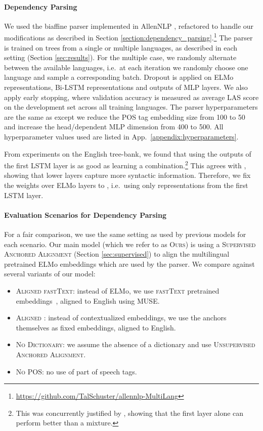 \documentclass[11pt,a4paper]{article}
\newcommand{\secref}[1]{Section \ref{#1}}
\newcommand{\appref}[1]{App.~\ref{#1}}
\begin{document}
\paragraph{Dependency Parsing}
We used the biaffine parser implemented in AllenNLP \cite{gardner_allennlp_2018}, refactored to handle our modifications as described in \secref{section:dependency_parsing}.\footnote{\url{https://github.com/TalSchuster/allennlp-MultiLang}} The parser is trained on trees from a single or multiple languages, as described in each setting (\secref{sec:results}). For the multiple case, we randomly alternate between the available languages, i.e.\ at each iteration we randomly choose one language and sample a corresponding batch.
Dropout \cite{srivastava_dropout:_2014} is applied on ELMo representations, Bi-LSTM representations and outputs of MLP layers. We also apply early stopping, where validation accuracy is measured as average LAS score on the development set across all training languages. 
The parser hyperparameters are the same as \citet{dozat_stanford_2018} except we reduce the POS tag embedding size from 100 to 50 and increase the head/dependent MLP dimension from 400 to 500. 
All hyperparameter values used are listed in \appref{appendix:hyperparameters}.  


From experiments on the English tree-bank, we found that using the outputs of the first LSTM layer is as good as learning a combination.\footnote{This was concurrently justified by \citet{liu-naacl}, showing that the first layer alone can perform better than a mixture.} This agrees with \citet{belinkov2017evaluating}, showing that lower layers capture more syntactic information. Therefore, we fix the weights over ELMo layers to , i.e.\ using only representations from the first LSTM layer.



\paragraph{Evaluation Scenarios for Dependency Parsing}

For a fair comparison, we use the same setting as used by previous models for each scenario.
Our main model (which we refer to as \textsc{Ours}) is using a \textsc{Supervised Anchored Alignment} (\secref{sec:supervised}) to align the multilingual pretrained ELMo embeddings which are used by the parser.
We compare against several variants of our model:

\begin{itemize}[leftmargin=*]
 
    \item \textsc{Aligned fastText}: instead of ELMo, we use \textsc{fastText} pretrained embeddings~\citep{grave2018learning}, aligned to English using MUSE.
\item \textsc{Aligned }: instead of contextualized embeddings, we use the anchors themselves as fixed embeddings, aligned to English.
\item \textsc{No Dictionary}: we assume the absence of a dictionary and use \textsc{Unsupervised Anchored Alignment}.
\item \textsc{No POS}: no use of part of speech tags.
\end{itemize}
\end{document}
